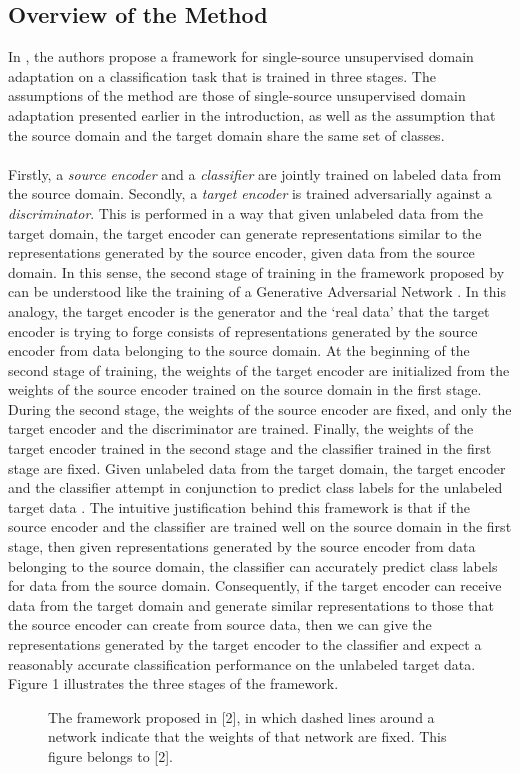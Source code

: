 \documentclass[14pt]{extarticle}
\begin{document}
		\subsection{Overview of the Method}
		In \cite{adda}, the authors propose a framework for single-source unsupervised domain adaptation on a classification task that is trained in three stages. The assumptions of the method are those of single-source unsupervised domain adaptation presented earlier in the introduction, as well as the assumption that the source domain and the target domain share the same set of classes.\\\\
		Firstly, a \textit{source encoder} and a \textit{classifier} are jointly trained on labeled data from the source domain. Secondly, a \textit{target encoder} is trained adversarially against a \textit{discriminator}. This is performed in a way that given unlabeled data from the target domain, the target encoder can generate representations similar to the representations generated by the source encoder, given data from the source domain. In this sense, the second stage of training in the framework proposed by \cite{adda} can be understood like the training of a Generative Adversarial Network \cite{gan}. In this analogy, the target encoder is the generator and the `real data' that the target encoder is trying to forge consists of representations generated by the source encoder from data belonging to the source domain. At the beginning of the second stage of training, the weights of the target encoder are initialized from the weights of the source encoder trained on the source domain in the first stage. During the second stage, the weights of the source encoder are fixed, and only the target encoder and the discriminator are trained. Finally, the weights of the target encoder trained in the second stage and the classifier trained in the first stage are fixed. Given unlabeled data from the target domain, the target encoder and the classifier attempt in conjunction to predict class labels for the unlabeled target data \cite{adda}. The intuitive justification behind this framework is that if the source encoder and the classifier are trained well on the source domain in the first stage, then given representations generated by the source encoder from data belonging to the source domain, the classifier can accurately predict class labels for data from the source domain. Consequently, if the target encoder can receive data from the target domain and generate similar representations to those that the source encoder can create from source data, then we can give the representations generated by the target encoder to the classifier and expect a reasonably accurate classification performance on the unlabeled target data. Figure 1 illustrates the three stages of the framework.
		\begin{figure}[H]
			\begin{center}
				\caption{The framework proposed in [2], in which dashed lines around a network indicate that the weights of that network are fixed. This figure belongs to [2].}
			\end{center}
		\end{figure}
\end{document}
